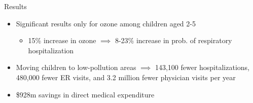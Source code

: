 \documentclass{beamer}
\begin{document}
\begin{frame}{Results}
    \begin{itemize}
        \item Significant results only for ozone among children aged 2-5
        \begin{itemize}
            \item 15\% increase in ozone $\implies$ 8-23\% increase in prob. of respiratory hospitalization
        \end{itemize}
        \item Moving children to low-pollution areas $\implies$ 143,100 fewer hospitalizations, 480,000 fewer ER visits, and 3.2 million fewer physician visits per year
        \item \$928m savings in direct medical expenditure
    \end{itemize}
\end{frame}
\end{document}

